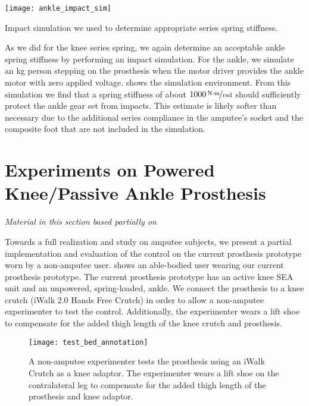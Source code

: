 \begin{marginfigure}[-0.0in]
    \centering 
    \texttt{[image: ankle\_impact\_sim]}
    \caption{Impact simulation we used to determine appropriate series spring
    stiffness.}\label{fig:ankle_impact_sim}
\end{marginfigure}
As we did for the knee series spring, we again determine an acceptable ankle
spring stiffness by performing an impact simulation. For the ankle, we simulate
an \unit[80]{kg} person stepping on the prosthesis when the motor driver
provides the ankle motor with zero applied voltage. 
shows the simulation environment. From this simulation we find that a spring
stiffness of about $\unitfrac[1000]{N \cdot m}{rad}$ should sufficiently protect
the ankle gear set from impacts. This estimate is likely softer than necessary
due to the additional series compliance in the amputee's socket and the
composite foot that are not included in the simulation.

\section{Experiments on Powered Knee/Passive Ankle
Prosthesis}\label{sec:complete_exp} 

\emph{Material in this section based partially on
\citet{thatte2016toward}\cite{thatte2016toward}}
\linebreak

Towards a full realization and study on amputee subjects, we present a partial
implementation and evaluation of the control on the current prosthesis prototype
worn by a non-amputee user.  shows an able-bodied
user wearing our current prosthesis prototype. The current prosthesis prototype
has an active knee SEA unit and an unpowered, spring-loaded, ankle.  We connect
the prosthesis to a knee crutch (iWalk 2.0 Hands Free Crutch) in order to allow
a non-amputee experimenter to test the control. Additionally, the experimenter
wears a lift shoe to compensate for the added thigh length of the knee crutch
and prosthesis.
\begin{figure}
    \centering 
    \texttt{[image: test\_bed\_annotation]}
    \caption{A non-amputee experimenter tests the prosthesis using an iWalk
    Crutch as a knee adaptor. The experimenter wears a lift shoe on the
    contralateral leg to compensate for the added thigh length of the prosthesis
    and knee adaptor.
    }\label{fig:test_bed_annotation}
\end{figure}

